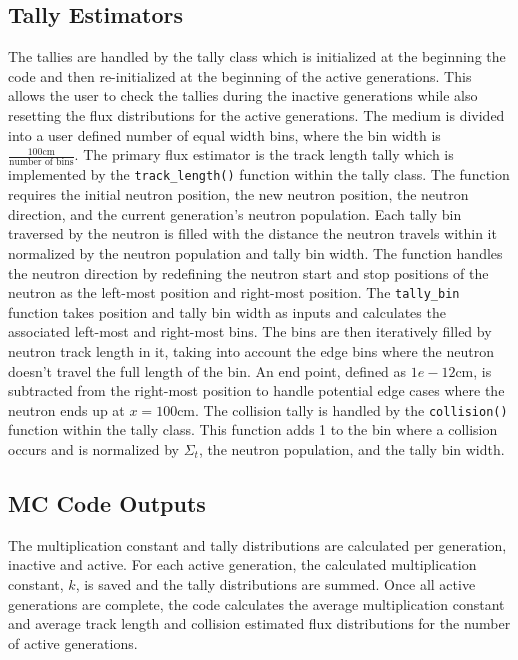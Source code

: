 \documentclass[letterpaper]{article}
\begin{document}
\subsection{Tally Estimators}
The tallies are handled by the tally class which is initialized at the beginning the code and then re-initialized at the beginning of the active generations. This allows the user to check the tallies during the inactive generations while also resetting the flux distributions for the active generations. The medium is divided into a user defined number of equal width bins, where the bin width is $\frac{100\text{cm}}{\text{number of bins}}$. The primary flux estimator is the track length tally which is implemented by the \texttt{track\_length()} function within the tally class. The function requires the initial neutron position, the new neutron position, the neutron direction, and the current generation's neutron population. Each tally bin traversed by the neutron is filled with the distance the neutron travels within it normalized by the neutron population and tally bin width. The function handles the neutron direction by redefining the neutron start and stop positions of the neutron as the left-most position and right-most position. The \texttt{tally\_bin} function takes position and tally bin width as inputs and calculates the associated left-most and right-most bins. The bins are then iteratively filled by neutron track length in it, taking into account the edge bins where the neutron doesn't travel the full length of the bin. An end point, defined as $1e-12$cm, is subtracted from the right-most position to handle potential edge cases where the neutron ends up at $x=100$cm. The collision tally is handled by the \texttt{collision()} function within the tally class. This function adds 1 to the bin where a collision occurs and is normalized by $\Sigma_t$, the neutron population, and the tally bin width. 

\subsection{MC Code Outputs}
The multiplication constant and tally distributions are calculated per generation, inactive and active. For each active generation, the calculated multiplication constant, $k$, is saved and the tally distributions are summed. Once all active generations are complete, the code calculates the average multiplication constant and average track length and collision estimated flux distributions for the number of active generations.
\end{document}
